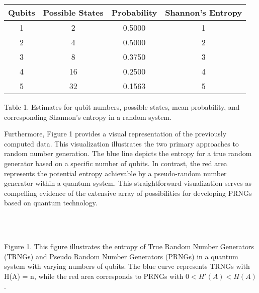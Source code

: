 \documentclass[12pt]{article}
\begin{document}
	 		\begin{center}
	 			\begin{tabular}{ |c|c|c|c| } 
	 				\hline
	 				Qubits  & Possible States  & Probability & Shannon’s Entropy\\
	 				\hline
	 				1 & 2 & 0.5000 & 1 \\ 
	 				2 & 4 & 0.5000 & 2 \\ 
	 				3 & 8 & 0.3750 & 3 \\ 
	 				4 & 16 & 0.2500 & 4 \\ 
	 				5 & 32 & 0.1563 & 5 \\ 
	 				\hline
	 			\end{tabular}
	 		\end{center}
	   		{Table 1. Estimates for qubit numbers, possible states, mean probability, and corresponding Shannon’s entropy in a random
	   		system.\\\par
	   		Furthermore, Figure 1 provides a visual representation of the previously computed data. This visualization illustrates the
	   		two primary approaches to random number generation. The blue line depicts the entropy for a true random generator based on a
	   		specific number of qubits. In contrast, the red area represents the potential entropy achievable by a pseudo-random number
	   		generator within a quantum system. This straightforward visualization serves as compelling evidence of the extensive array of
	   		possibilities for developing PRNGs based on quantum technology.}\\
	   		
	   		
	   		\\
	   	 	{Figure 1. This figure illustrates the entropy of True Random Number Generators (TRNGs) and Pseudo Random Number
	   	 		Generators (PRNGs) in a quantum system with varying numbers of qubits. The blue curve represents TRNGs with H(A) = n,
	   	 		while the red area corresponds to PRNGs with $0 < H'(A) < H(A)$.}\\\\
	   	 	
\end{document}
